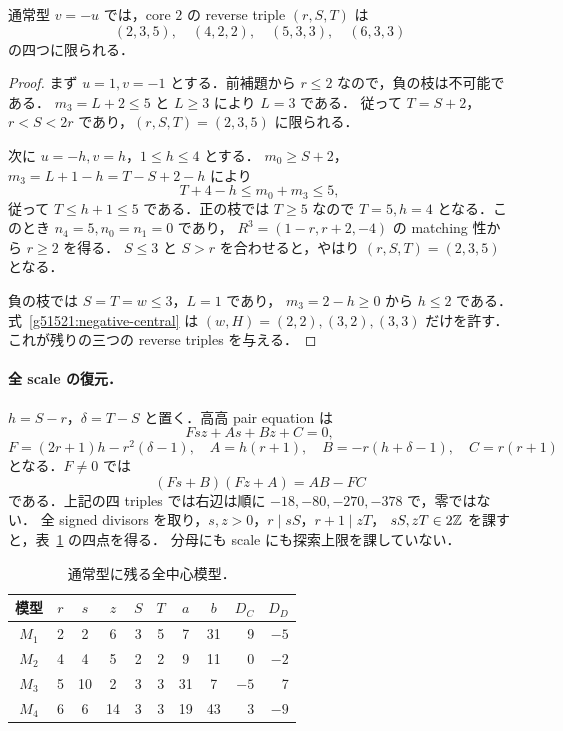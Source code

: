 \begin{proposition}\label{g51521:ordinary-reverse}
通常型 $v=-u$ では，core $2$ の reverse triple $(r,S,T)$ は
\[
 (2,3,5),\quad (4,2,2),\quad (5,3,3),\quad (6,3,3)
\]
の四つに限られる．
\end{proposition}
\begin{proof}
まず $u=1,v=-1$ とする．前補題から $r\le2$ なので，負の枝は不可能である．
$m_3=L+2\le5$ と $L\ge3$ により $L=3$ である．
従って $T=S+2$，$r<S<2r$ であり，$(r,S,T)=(2,3,5)$ に限られる．

次に $u=-h,v=h$，$1\le h\le4$ とする．
$m_0\ge S+2$，$m_3=L+1-h=T-S+2-h$ により
\[
 T+4-h\le m_0+m_3\le5,
\]
従って $T\le h+1\le5$ である．正の枝では $T\ge5$ なので
$T=5,h=4$ となる．このとき $n_4=5,n_0=n_1=0$ であり，
$R^3=(1-r,r+2,-4)$ の matching 性から $r\ge2$ を得る．
$S\le3$ と $S>r$ を合わせると，やはり $(r,S,T)=(2,3,5)$ となる．

負の枝では $S=T=w\le3$，$L=1$ であり，
$m_3=2-h\ge0$ から $h\le2$ である．
式~\eqref{g51521:negative-central} は
$(w,H)=(2,2),(3,2),(3,3)$ だけを許す．これが残りの三つの reverse triples を与える．
\end{proof}

\paragraph{全 scale の復元．}
$h=S-r$，$\delta=T-S$ と置く．高高 pair equation は
\begin{equation}\label{g51521:bilinear}
 Fsz+As+Bz+C=0,
\end{equation}
\[
 F=(2r+1)h-r^2(\delta-1),\quad
 A=h(r+1),\quad B=-r(h+\delta-1),\quad C=r(r+1)
\]
となる．$F\ne0$ では
\begin{equation}\label{g51521:factorization}
 (Fs+B)(Fz+A)=AB-FC
\end{equation}
である．上記の四 triples では右辺は順に $-18,-80,-270,-378$ で，零ではない．
全 signed divisors を取り，$s,z>0$，$r\mid sS$，$r+1\mid zT$，
$sS,zT\in2\mathbb Z$ を課すと，表~\ref{g51521:center-table} の四点を得る．
分母にも scale にも探索上限を課していない．

\begin{table}[htbp]
\centering\small
\begin{tabular}{c|ccccc|cc|rr}
模型&$r$&$s$&$z$&$S$&$T$&$a$&$b$&$D_C$&$D_D$\\\hline
$M_1$&2&2&6&3&5&7&31&9&$-5$\\
$M_2$&4&4&5&2&2&9&11&0&$-2$\\
$M_3$&5&10&2&3&3&31&7&$-5$&7\\
$M_4$&6&6&14&3&3&19&43&3&$-9$
\end{tabular}
\caption{通常型に残る全中心模型．}\label{g51521:center-table}
\end{table}

